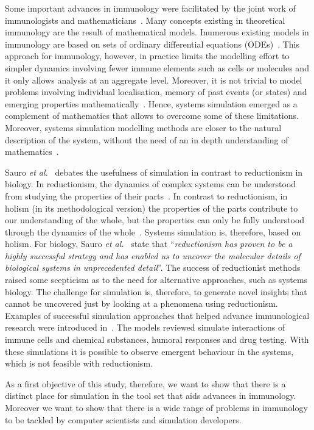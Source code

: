 \documentclass{llncs}
\begin{document}
Some important advances in immunology were facilitated by the joint work of immunologists and mathematicians~\cite{Louzoun:2007}. Many concepts existing in theoretical immunology are the result of mathematical models. Inumerous existing models in immunology are based on sets of ordinary differential equations (ODEs)~\cite{Gruber:2003,Eftimie2010}. This approach for immunology, however, in practice limits the modelling effort to simpler dynamics involving fewer immune elements such as cells or molecules and it only allows analysis at an aggregate level.  Moreover, it is not trivial to model problems involving individual localisation, memory of past events (or states) and emerging properties mathematically~\cite{Louzoun:2007}. Hence, systems simulation emerged as a complement of mathematics that allows to overcome some of these limitations. Moreover, systems simulation modelling methods are closer to the natural description of the system, without the need of an in depth understanding of mathematics~\cite{Bonabeau:2002}.

Sauro {\it et al.}~\cite{Sauro:2006} debates the usefulness of simulation in contrast to reductionism in biology. In reductionism, the dynamics of  complex systems can be understood from studying the properties of their parts~\cite{Conscilience:2007}. In contrast to reductionism, in holism (in its methodological version) the properties of the parts contribute to our understanding of the whole, but the properties can only be fully understood through the dynamics of the whole~\cite{Conscilience:2007}. Systems simulation is, therefore, based on holism. For biology, Sauro {\it et al.}~\cite{Sauro:2006} state that ``{\it reductionism has proven to be a highly successful strategy and has enabled us to uncover the molecular details of biological systems in unprecedented detail}''. The success of reductionist methods raised some scepticism as to the need for alternative approaches, such as systems biology. The challenge for simulation is, therefore, to generate novel insights that cannot be uncovered just by looking at a phenomena using reductionism. Examples of successful simulation approaches that helped advance immunological research were introduced in~\cite{Nuno:2007}. The models reviewed simulate interactions of immune cells and chemical substances, humoral responses and drug testing. With these simulations it is possible to observe emergent behaviour in the systems, which is not feasible with reductionism.

As a first objective of this study, therefore, we want to show that there is a distinct place for simulation in the tool set that aids advances in immunology. Moreover we want to show that there is a wide range of problems in immunology to be tackled by computer scientists and simulation developers.
\end{document}
